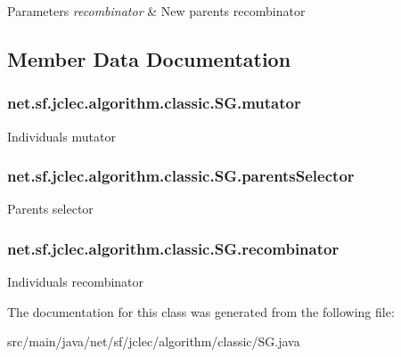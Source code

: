 \begin{DoxyParams}{Parameters}
{\em recombinator} & New parents recombinator \\
\hline
\end{DoxyParams}


\subsection{Member Data Documentation}
\hypertarget{classnet_1_1sf_1_1jclec_1_1algorithm_1_1classic_1_1_s_g_a09ed262ead4acffefd99566fbe645184}{
\subsubsection[{mutator}]{ net.\-sf.\-jclec.\-algorithm.\-classic.\-S\-G.\-mutator\hspace{0.3cm}{\ttfamily [protected]}}}\label{classnet_1_1sf_1_1jclec_1_1algorithm_1_1classic_1_1_s_g_a09ed262ead4acffefd99566fbe645184}
Individuals mutator \hypertarget{classnet_1_1sf_1_1jclec_1_1algorithm_1_1classic_1_1_s_g_aeb8173ace1e16d89028b97678822f603}{
\subsubsection[{parents\-Selector}]{ net.\-sf.\-jclec.\-algorithm.\-classic.\-S\-G.\-parents\-Selector\hspace{0.3cm}{\ttfamily [protected]}}}\label{classnet_1_1sf_1_1jclec_1_1algorithm_1_1classic_1_1_s_g_aeb8173ace1e16d89028b97678822f603}
Parents selector \hypertarget{classnet_1_1sf_1_1jclec_1_1algorithm_1_1classic_1_1_s_g_a64b6a952a98acd9193bcb32852b84250}{
\subsubsection[{recombinator}]{ net.\-sf.\-jclec.\-algorithm.\-classic.\-S\-G.\-recombinator\hspace{0.3cm}{\ttfamily [protected]}}}\label{classnet_1_1sf_1_1jclec_1_1algorithm_1_1classic_1_1_s_g_a64b6a952a98acd9193bcb32852b84250}
Individuals recombinator 

The documentation for this class was generated from the following file\-:\begin{DoxyCompactItemize}
\item 
src/main/java/net/sf/jclec/algorithm/classic/S\-G.\-java\end{DoxyCompactItemize}
